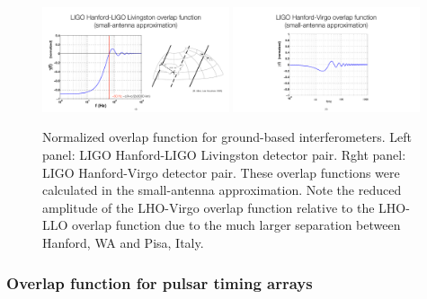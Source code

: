 \begin{figure}[htbp!]
\begin{center}
\includegraphics[width=0.49\textwidth]{Figures/LHO-LLO-orf}
\includegraphics[width=0.49\textwidth]{Figures/LHO-Virgo-orf}
\caption{Normalized overlap function for ground-based
interferometers.
Left panel: LIGO Hanford-LIGO Livingston detector pair.
Rght panel: LIGO Hanford-Virgo detector pair.
These overlap functions were calculated in the small-antenna
approximation.
Note the reduced amplitude of the LHO-Virgo overlap function
relative to the LHO-LLO overlap function due to the much larger 
separation between Hanford, WA and Pisa, Italy.}
\label{f:orfs}
\end{center}
\end{figure}

\subsubsection{Overlap function for pulsar timing arrays}

